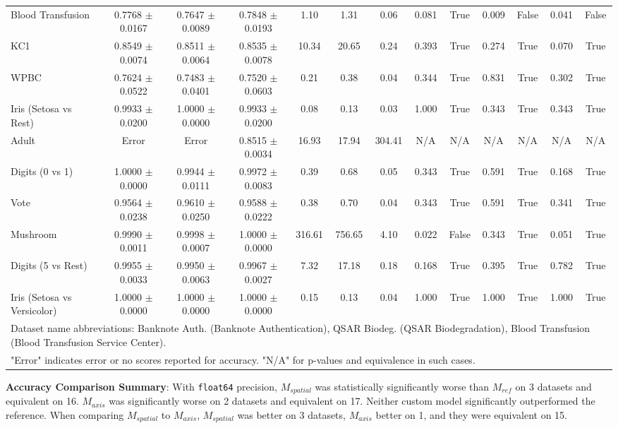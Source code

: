 \documentclass[conference]{IEEEtran}
\begin{document}
\begin{table}[htbp]
{\begin{tabular}{@{}lcccccccccccc@{}}
Blood Transfusion & 0.7768 $\pm$ 0.0167 & 0.7647 $\pm$ 0.0089 & 0.7848 $\pm$ 0.0193 & 1.10 & 1.31 & 0.06 & 0.081 & True & 0.009 & False & 0.041 & False \\
KC1 & 0.8549 $\pm$ 0.0074 & 0.8511 $\pm$ 0.0064 & 0.8535 $\pm$ 0.0078 & 10.34 & 20.65 & 0.24 & 0.393 & True & 0.274 & True & 0.070 & True \\
WPBC & 0.7624 $\pm$ 0.0522 & 0.7483 $\pm$ 0.0401 & 0.7520 $\pm$ 0.0603 & 0.21 & 0.38 & 0.04 & 0.344 & True & 0.831 & True & 0.302 & True \\
Iris (Setosa vs Rest) & 0.9933 $\pm$ 0.0200 & 1.0000 $\pm$ 0.0000 & 0.9933 $\pm$ 0.0200 & 0.08 & 0.13 & 0.03 & 1.000 & True & 0.343 & True & 0.343 & True \\
Adult & Error & Error & 0.8515 $\pm$ 0.0034 & 16.93 & 17.94 & 304.41 & N/A & N/A & N/A & N/A & N/A & N/A \\
Digits (0 vs 1) & 1.0000 $\pm$ 0.0000 & 0.9944 $\pm$ 0.0111 & 0.9972 $\pm$ 0.0083 & 0.39 & 0.68 & 0.05 & 0.343 & True & 0.591 & True & 0.168 & True \\
Vote & 0.9564 $\pm$ 0.0238 & 0.9610 $\pm$ 0.0250 & 0.9588 $\pm$ 0.0222 & 0.38 & 0.70 & 0.04 & 0.343 & True & 0.591 & True & 0.341 & True \\
Mushroom & 0.9990 $\pm$ 0.0011 & 0.9998 $\pm$ 0.0007 & 1.0000 $\pm$ 0.0000 & 316.61 & 756.65 & 4.10 & 0.022 & False & 0.343 & True & 0.051 & True \\
Digits (5 vs Rest) & 0.9955 $\pm$ 0.0033 & 0.9950 $\pm$ 0.0063 & 0.9967 $\pm$ 0.0027 & 7.32 & 17.18 & 0.18 & 0.168 & True & 0.395 & True & 0.782 & True \\
Iris (Setosa vs Versicolor) & 1.0000 $\pm$ 0.0000 & 1.0000 $\pm$ 0.0000 & 1.0000 $\pm$ 0.0000 & 0.15 & 0.13 & 0.04 & 1.000 & True & 1.000 & True & 1.000 & True \\
\bottomrule
\multicolumn{13}{l}{Dataset name abbreviations: Banknote Auth. (Banknote Authentication), QSAR Biodeg. (QSAR Biodegradation), Blood Transfusion (Blood Transfusion Service Center).} \\
\multicolumn{13}{l}{"Error" indicates error or no scores reported for accuracy. "N/A" for p-values and equivalence in such cases.}
\end{tabular}%
}
\end{table}

\textbf{Accuracy Comparison Summary}:
With \texttt{float64} precision, $M_{spatial}$ was statistically significantly worse than $M_{ref}$ on 3 datasets and equivalent on 16. $M_{axis}$ was significantly worse on 2 datasets and equivalent on 17. Neither custom model significantly outperformed the reference. When comparing $M_{spatial}$ to $M_{axis}$, $M_{spatial}$ was better on 3 datasets, $M_{axis}$ better on 1, and they were equivalent on 15.
\end{document}
